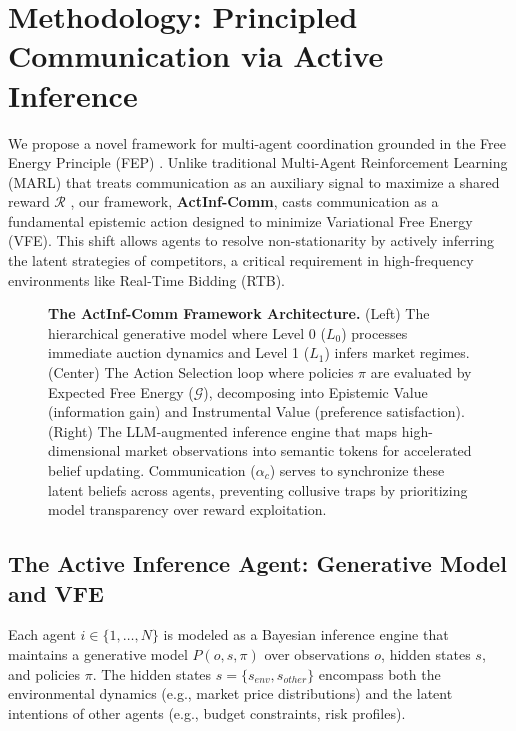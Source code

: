 \section{Methodology: Principled Communication via Active Inference}
\label{sec:methodology}

We propose a novel framework for multi-agent coordination grounded in the Free Energy Principle (FEP) \cite{friston2010free, friston2017active}. Unlike traditional Multi-Agent Reinforcement Learning (MARL) that treats communication as an auxiliary signal to maximize a shared reward $\mathcal{R}$ \cite{lowe2017multi, rashid2018qmix}, our framework, \textbf{ActInf-Comm}, casts communication as a fundamental epistemic action designed to minimize Variational Free Energy (VFE). This shift allows agents to resolve non-stationarity by actively inferring the latent strategies of competitors, a critical requirement in high-frequency environments like Real-Time Bidding (RTB).

\begin{figure}[t]
    \centering
    \caption{\textbf{The ActInf-Comm Framework Architecture.} (Left) The hierarchical generative model where Level 0 ($L_0$) processes immediate auction dynamics and Level 1 ($L_1$) infers market regimes. (Center) The Action Selection loop where policies $\pi$ are evaluated by Expected Free Energy ($\mathcal{G}$), decomposing into Epistemic Value (information gain) and Instrumental Value (preference satisfaction). (Right) The LLM-augmented inference engine that maps high-dimensional market observations into semantic tokens for accelerated belief updating. Communication ($\alpha_c$) serves to synchronize these latent beliefs across agents, preventing collusive traps by prioritizing model transparency over reward exploitation.}
    \label{fig:framework}
\end{figure}

\subsection{The Active Inference Agent: Generative Model and VFE}
\label{sec:agent_model}

Each agent $i \in \{1, \dots, N\}$ is modeled as a Bayesian inference engine that maintains a generative model $P(o, s, \pi)$ over observations $o$, hidden states $s$, and policies $\pi$. The hidden states $s = \{s_{env}, s_{other}\}$ encompass both the environmental dynamics (e.g., market price distributions) and the latent intentions of other agents (e.g., budget constraints, risk profiles).

